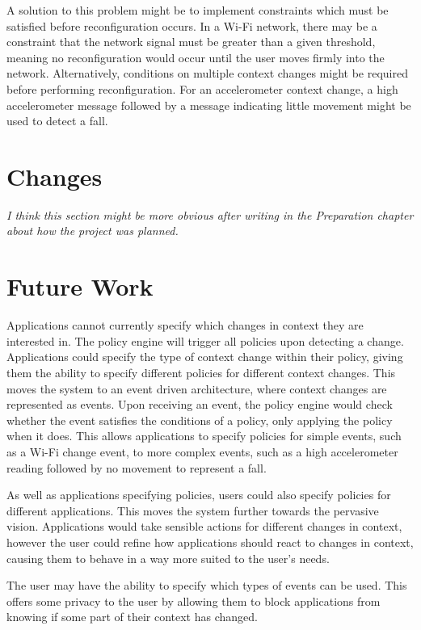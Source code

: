 \documentclass[12pt,twoside,notitlepage]{report}
\begin{document}
A solution to this problem might be to implement constraints which must be satisfied before reconfiguration occurs. 
In a Wi-Fi network, there may be a constraint that the network signal must be greater than a given threshold, meaning no reconfiguration would occur until the user moves firmly into the network. 
Alternatively, conditions on multiple context changes might be required before performing reconfiguration.  
For an accelerometer context change, a high accelerometer message followed by a message indicating little movement might be used to detect a fall.

\section{Changes}
{\sl I think this section might be more obvious after writing in the Preparation chapter about how the project was planned. }


\section{Future Work}

Applications cannot currently specify which changes in context they are interested in. 
The policy engine will trigger all policies upon detecting a change.
Applications could specify the type of context change within their policy, giving them the ability to specify different policies for different context changes. 
This moves the system to an event driven architecture, where context changes are represented as events. 
Upon receiving an event, the policy engine would check whether the event satisfies the conditions of a policy, only applying the policy when it does. 
This allows applications to specify policies for simple events, such as a Wi-Fi change event, to more complex events, such as a high accelerometer reading followed by no movement to represent a fall. 

As well as applications specifying policies, users could also specify policies for different applications. 
This moves the system further towards the pervasive vision. 
Applications would take sensible actions for different changes in context, however the user could refine how applications should react to changes in context, causing them to behave in a way more suited to the user's needs.

The user may have the ability to specify which types of events can be used. 
This offers some privacy to the user by allowing them to block applications from knowing if some part of their context has changed.
\end{document}

